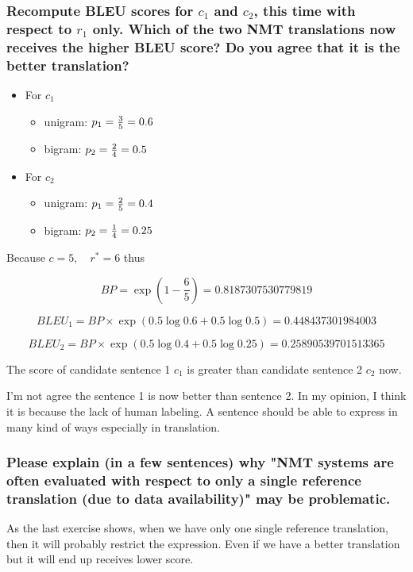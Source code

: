 \documentclass[12pt, letterpaper]{article}
\begin{document}
\subsubsection{Recompute BLEU scores for $c_1$ and $c_2$, this time with respect to $r_1$ only. Which of the two NMT translations now receives the higher BLEU score? Do you agree that it is the better translation?}

\begin{itemize}[topsep=0pt, partopsep=0pt]
  \item For $c_1$ {
    \begin{itemize}
      \item unigram: $p_1 = {3 \over 5} = 0.6$
      \item bigram: $p_2 = {2 \over 4} = 0.5$
    \end{itemize}
  }
  \item For $c_2$ {
    \begin{itemize}
      \item unigram: $p_1 = {2 \over 5} = 0.4$
      \item bigram: $p_2 = {1 \over 4} = 0.25$
    \end{itemize}
  }
\end{itemize}

Because $c = 5,\quad r^* = 6$ thus

$$
BP = \exp(1 - \frac{6}{5}) = 0.8187307530779819
$$

$$
BLEU_1 = BP \times \exp(0.5 \log 0.6 + 0.5 \log 0.5) = 0.448437301984003
$$

$$
BLEU_2 = BP \times \exp(0.5 \log 0.4 + 0.5 \log 0.25) = 0.25890539701513365
$$

The score of candidate sentence 1 $c_1$ is greater than candidate sentence 2 $c_2$ now.

I'm not agree the sentence 1 is now better than sentence 2. In my opinion, I think it is because the lack of human labeling. A sentence should be able to express in many kind of ways especially in translation.

\subsubsection{Please explain (in a few sentences) why "NMT systems are often evaluated with respect to only a single reference translation (due to data availability)" may be problematic.}

As the last exercise shows, when we have only one single reference translation, then it will probably restrict the expression. Even if we have a better translation but it will end up receives lower score.
\end{document}
